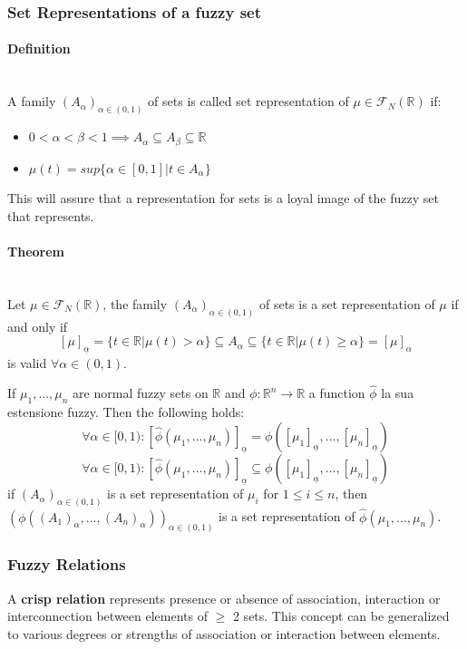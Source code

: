 \documentclass{article}
\begin{document}
\subsubsection{Set Representations of a fuzzy set}
\paragraph{Definition}\mbox{}\\
A family $(A_\alpha)_{\alpha\in (0,1)}$ of sets is called set representation of $\mu\in\mathcal{F}_N(\mathbb{R})$ if:
\begin{itemize}
    \item $0<\alpha<\beta<1\implies A_\alpha\subseteq A_\beta\subseteq\mathbb{R}$
    \item $\mu(t)=sup\{\alpha\in [0,1]|t\in A_\alpha\}$
\end{itemize}
This will assure that a representation for sets is a loyal image of the fuzzy set that represents.
\paragraph{Theorem}\mbox{}\\
Let $\mu\in\mathcal{F}_N(\mathbb{R})$, the family $(A_\alpha)_{\alpha\in (0,1)}$ of sets is a set
representation of $\mu$ if and only if
$$[\mu]_{\underline{\alpha}} = \{t\in\mathbb{R}|\mu(t) > \alpha \}\subseteq A_\alpha \subseteq \{t\in\mathbb{R}|\mu (t) \geq \alpha\}=[\mu]_\alpha$$
is valid $\forall \alpha\in (0,1)$.

If $\mu_1,...,\mu_n$ are normal fuzzy sets on $\mathbb{R}$ and $\phi:\mathbb{R}^n\rightarrow\mathbb{R}$
a function $\hat{\phi}$ la sua estensione fuzzy. Then the following holds:
$$\forall\alpha\in [0,1) : [\hat{\phi}(\mu_1,...,\mu_n)]_{\underline{\alpha}}=\phi([\mu_1]_{\underline{\alpha}},...,[\mu_n]_{\underline{\alpha}})$$
$$\forall\alpha\in [0,1) : [\hat{\phi}(\mu_1,...,\mu_n)]_{\underline{\alpha}}\subseteq\phi([\mu_1]_{\underline{\alpha}},...,[\mu_n]_{\underline{\alpha}})$$
if $(A_\alpha)_{\alpha\in (0,1)}$ is a set representation of $\mu_i$ for $1\leq i\leq n$, then
$\left(\phi((A_1)_\alpha,...,(A_n)_\alpha)\right)_{\alpha\in (0,1)}$ is a set representation of
$\hat{\phi}(\mu_1,...,\mu_n)$.

\subsubsection{Fuzzy Relations}
A \textbf{crisp relation} represents presence or absence of association, interaction or interconnection
between elements of $\geq$ 2 sets. This concept can be generalized to various degrees or strengths
of association or interaction between elements.
\end{document}
